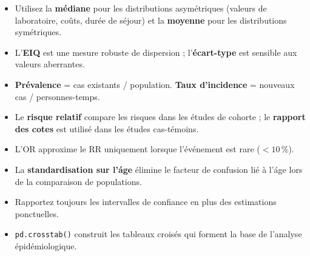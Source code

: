 \begin{itemize}
  \item Utilisez la \textbf{m\'ediane} pour les distributions asym\'etriques (valeurs de laboratoire, co\^uts, dur\'ee de s\'ejour) et la \textbf{moyenne} pour les distributions sym\'etriques.
  \item L'\textbf{EIQ} est une mesure robuste de dispersion ; l'\textbf{\'ecart-type} est sensible aux valeurs aberrantes.
  \item \textbf{Pr\'evalence} = cas existants / population. \textbf{Taux d'incidence} = nouveaux cas / personnes-temps.
  \item Le \textbf{risque relatif} compare les risques dans les \'etudes de cohorte ; le \textbf{rapport des cotes} est utilis\'e dans les \'etudes cas-t\'emoins.
  \item L'OR approxime le RR uniquement lorsque l'\'ev\'enement est rare ($<10\,\%$).
  \item La \textbf{standardisation sur l'\'age} \'elimine le facteur de confusion li\'e \`a l'\'age lors de la comparaison de populations.
  \item Rapportez toujours les intervalles de confiance en plus des estimations ponctuelles.
  \item \texttt{pd.crosstab()} construit les tableaux crois\'es qui forment la base de l'analyse \'epid\'emiologique.
\end{itemize}
